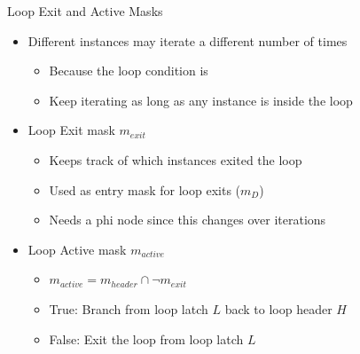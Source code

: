 
\begin{frame}{Loop Exit and Active Masks}

\begin{minipage}[t]{0.70\linewidth}

\begin{itemize}
    \item Different instances may iterate a different number of times
    \begin{itemize}
        \item Because the loop condition is 
        \item Keep iterating as long as any instance is inside the loop
    \end{itemize}
    \item Loop Exit mask $m_{exit}$
    \begin{itemize}
        \item Keeps track of which instances exited the loop
        \item Used as entry mask for loop exits ($m_D$)
        \item Needs a phi node since this changes over iterations
    \end{itemize}
    \item Loop Active mask $m_{active}$
    \begin{itemize}
        \item $m_{active} = m_{header} \cap \neg m_{exit}$
        \item True: Branch from loop latch $L$ back to loop header $H$
        \item False: Exit the loop from loop latch $L$
    \end{itemize}
\end{itemize}

\end{minipage}
\hspace{1em}
\begin{minipage}[t]{0.23\linewidth}

\vspace{0.1ex}


\end{minipage}
\end{frame}
